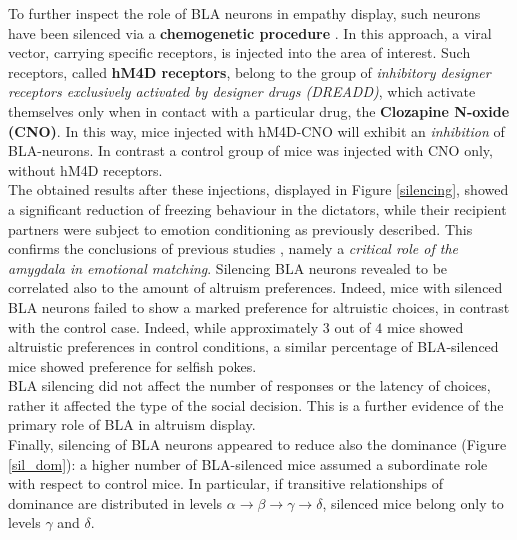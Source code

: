 \documentclass[12pt, a4paper]{report}
\begin{document}
To further inspect the role of BLA neurons in empathy display, such neurons have been silenced via a \textbf{chemogenetic procedure} \cite{33}. %
In this approach, a viral vector, carrying specific receptors, is injected into the area of interest. Such receptors, called  \textbf{hM4D receptors}, belong to the group of \textit{inhibitory designer receptors exclusively activated by designer drugs (DREADD)}, which activate themselves only when in contact with a particular drug, the \textbf{Clozapine N-oxide (CNO)}. In this way, mice injected with hM4D-CNO will exhibit an \textit{inhibition} of BLA-neurons. In contrast a control group of mice was injected with CNO only, without hM4D receptors.\\
The obtained results after these injections, displayed in Figure \ref{silencing}, showed a significant reduction of freezing behaviour in the dictators, while their recipient partners were subject to emotion conditioning as previously described. This confirms the conclusions of previous studies \cite{34}, %
 namely a \textit{critical role of the amygdala in emotional matching}. Silencing BLA neurons revealed to be correlated also to the amount of altruism preferences. Indeed, mice with silenced BLA neurons failed to show a marked preference for altruistic choices, in contrast with the control case. Indeed, while approximately $3$ out of $4$ mice showed altruistic preferences in control conditions, a similar percentage of BLA-silenced mice showed preference for selfish pokes.\\
BLA silencing did not affect the number of responses or the latency of choices, rather it affected the type of the social decision. This is a further evidence of the primary role of BLA in altruism display.
\\
Finally,  silencing of BLA neurons appeared to reduce also the dominance (Figure \ref{sil_dom}): a higher number of BLA-silenced mice assumed a subordinate role with respect to control mice. In particular, if transitive relationships of dominance are distributed in levels $ \alpha \rightarrow \beta \rightarrow \gamma \rightarrow \delta $, silenced mice belong only to levels $ \gamma $ and $ \delta $.
\end{document}

